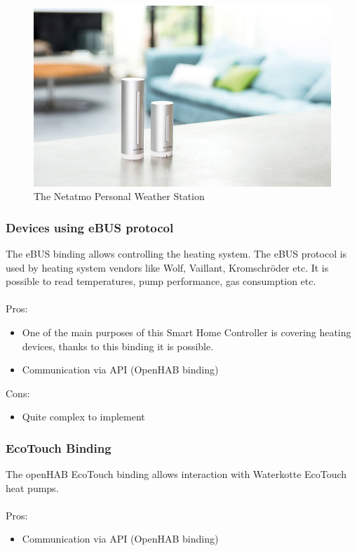 \begin{figure}
	\centering
	\includegraphics[width=1\textwidth]{images/Chapter_04/netatmo-weather-station.jpg}
	\caption{The Netatmo Personal Weather Station}
	\label{fig:netatmo-weather-station}
\end{figure}

\subsubsection{Devices using eBUS protocol}
The eBUS binding allows controlling the heating system. The eBUS protocol is used by heating system vendors like Wolf, Vaillant,
Kromschröder etc. It is possible to read temperatures, pump performance, gas consumption etc.\\~\\
Pros:
\begin{itemize}
	\item One of the main purposes of this Smart Home Controller is covering heating devices, thanks to this binding it is possible.
	\item Communication via API (OpenHAB binding)
\end{itemize}
Cons:
\begin{itemize}
	\item Quite complex to implement 
\end{itemize}

\subsubsection{EcoTouch Binding}
The openHAB EcoTouch binding allows interaction with Waterkotte EcoTouch heat pumps.\\~\\
Pros:
\begin{itemize}
	\item Communication via API (OpenHAB binding)
\end{itemize}


